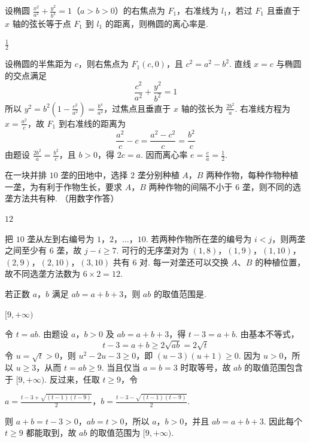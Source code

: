 \documentclass[UTF8,a4paper,oneside,11pt]{ctexbook}
\begin{document}
\begin{problem}
设椭圆 \(\frac{x^2}{a^2}+\frac{y^2}{b^2}=1\)（\(a>b>0\)）的右焦点为 \(F_1\)，右准线为 \(l_1\)，若过 \(F_1\) 且垂直于 \(x\) 轴的弦长等于点 \(F_1\) 到 \(l_1\) 的距离，则椭圆的离心率是\fillinblank{}.
\end{problem}

\begin{answer}
\(\frac12\)
\end{answer}

\begin{solution}
设椭圆的半焦距为 \(c\)，则右焦点为 \(F_1(c,0)\)，且
\(c^2=a^2-b^2\). 直线 \(x=c\) 与椭圆的交点满足
\[
\frac{c^2}{a^2}+\frac{y^2}{b^2}=1
\]
所以 \(y^2=b^2\left(1-\frac{c^2}{a^2}\right)=\frac{b^4}{a^2}\)，过焦点且垂直于 \(x\) 轴的弦长为
\(\frac{2b^2}{a}\). 右准线方程为 \(x=\frac{a^2}{c}\)，故 \(F_1\) 到右准线的距离为
\[
\frac{a^2}{c}-c=\frac{a^2-c^2}{c}=\frac{b^2}{c}
\]
由题设 \(\frac{2b^2}{a}=\frac{b^2}{c}\)，且 \(b>0\)，得 \(2c=a\). 因而离心率
\(e=\frac ca=\frac12\).
\end{solution}

\begin{problem}
在一块并排 \(10\) 垄的田地中，选择 \(2\) 垄分别种植 \(A\)，\(B\) 两种作物，每种作物种植一垄，为有利于作物生长，要求 \(A\)，\(B\) 两种作物的间隔不小于 \(6\) 垄，则不同的选垄方法共有\fillinblank{}种. （用数字作答）
\end{problem}

\begin{answer}
\(12\)
\end{answer}

\begin{solution}
把 \(10\) 垄从左到右编号为 \(1\)，\(2\)，\(\ldots\)，\(10\). 若两种作物所在垄的编号为 \(i<j\)，则两垄之间至少有 \(6\) 垄，故 \(j-i\ge7\). 可行的无序垄对为
\((1,8)\)，\((1,9)\)，\((1,10)\)，\((2,9)\)，\((2,10)\)，\((3,10)\)
共有 \(6\) 对. 每一对垄还可以交换 \(A\)、\(B\) 的种植位置，故不同选垄方法数为
\(6\times2=12\).
\end{solution}

\begin{problem}
若正数 \(a\)，\(b\) 满足 \(ab=a+b+3\)，则 \(ab\) 的取值范围是\fillinblank{}.
\end{problem}

\begin{answer}
\([9,+\infty)\)
\end{answer}

\begin{solution}
令 \(t=ab\). 由题设 \(a\)，\(b>0\) 及 \(ab=a+b+3\)，得
\(t-3=a+b\). 由基本不等式，
\[
t-3=a+b\ge2\sqrt{ab}=2\sqrt t
\]
令 \(u=\sqrt t>0\)，则 \(u^2-2u-3\ge0\)，即
\((u-3)(u+1)\ge0\). 因为 \(u>0\)，所以 \(u\ge3\)，从而 \(t=ab\ge9\). 当且仅当 \(a=b=3\) 时取等号，故
\(ab\) 的取值范围包含于 \([9,+\infty)\). 反过来，任取 \(t\ge9\)，令

\(a=\frac{t-3+\sqrt{(t-1)(t-9)}}{2}\)，\(b=\frac{t-3-\sqrt{(t-1)(t-9)}}{2}\).

则 \(a+b=t-3>0\)，\(ab=t>0\)，所以 \(a\)，\(b>0\)，并且 \(ab=a+b+3\). 因此每个 \(t\ge9\) 都能取到，故
\(ab\) 的取值范围为 \([9,+\infty)\).
\end{solution}
\end{document}
